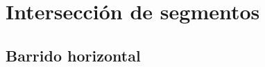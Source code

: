     
    
    \section{Intersección de segmentos}
    \subsection{Barrido horizontal}
    
    \frame{\sectionpage}
    
    
